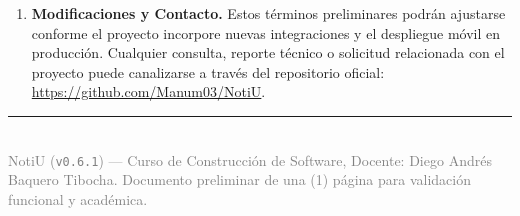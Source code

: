 \documentclass[10pt,letterpaper]{article}
\begin{document}
\begin{enumerate}[leftmargin=1.4em, itemsep=3.5pt, topsep=2pt, parsep=0pt, label=\textbf{\textcolor{notiuCrimson}{\arabic*.}}]
  \item \textbf{Modificaciones y Contacto.}
  Estos términos preliminares podrán ajustarse conforme el proyecto incorpore nuevas integraciones y el despliegue móvil en producción. Cualquier consulta, reporte técnico o solicitud relacionada con el proyecto puede canalizarse a través del repositorio oficial: \url{https://github.com/Manum03/NotiU}.

\end{enumerate}

\vfill
\noindent\textcolor{notiuCrimson}{\rule{\textwidth}{0.6pt}}\\[2pt]
{\scriptsize\textcolor{gray}{NotiU (\texttt{v0.6.1}) --- Curso de Construcción de Software, Docente: Diego Andrés Baquero Tibocha. Documento preliminar de una (1) página para validación funcional y académica.}}
\end{document}
